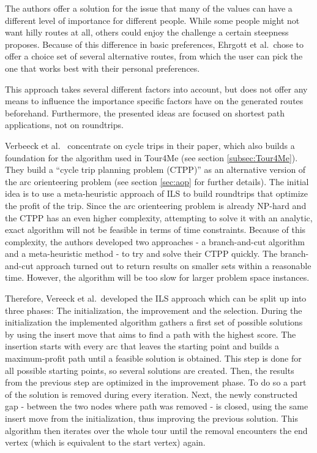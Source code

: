 The authors offer a solution for the issue that many of the values can have a different level of importance for different people. 
While some people might not want hilly routes at all, others could enjoy the challenge a certain steepness proposes. 
Because of this difference in basic preferences, Ehrgott et al.\ chose to offer a choice set of several alternative routes, from which the user can pick the one that works best with their personal preferences. 

This approach takes several different factors into account, but does not offer any means to influence the importance specific factors have on the generated routes beforehand.
Furthermore, the presented ideas are focused on shortest path applications, not on roundtrips.

Verbeeck et al.\ \cite{verbeeck_extension_2014} concentrate on cycle trips in their paper, which also builds a foundation for the algorithm used in Tour4Me (see section \ref{subsec:Tour4Me}). 
They build a \enquote{cycle trip planning problem (CTPP)} as an alternative version of the arc orienteering problem (see section \ref{sec:aop} for further details). 
The initial idea is to use a meta-heuristic approach of ILS to build roundtrips that optimize the profit of the trip.
Since the arc orienteering problem is already NP-hard and the CTPP has an even higher complexity, attempting to solve it with an analytic, exact algorithm will not be feasible in terms of time constraints. 
Because of this complexity, the authors developed two approaches - a branch-and-cut algorithm and a meta-heuristic method - to try and solve their CTPP quickly. 
The branch-and-cut approach turned out to return results on smaller sets within a reasonable time.
However, the algorithm will be too slow for larger problem space instances.

Therefore, Vereeck et al.\ developed the ILS approach which can be split up into three phases:
The initialization, the improvement and the selection.
During the initialization the implemented algorithm gathers a first set of possible solutions by using the insert move that aims to find a path with the highest score.
The insertion starts with every arc that leaves the starting point and builds a maximum-profit path until a feasible solution is obtained.
This step is done for all possible starting points, so several solutions are created.
Then, the results from the previous step are optimized in the improvement phase. 
To do so a part of the solution is removed during every iteration.
Next, the newly constructed gap - between the two nodes where path was removed - is closed, using the same insert move from the initialization, thus improving the previous solution.
This algorithm then iterates over the whole tour until the removal encounters the end vertex (which is equivalent to the start vertex) again.

